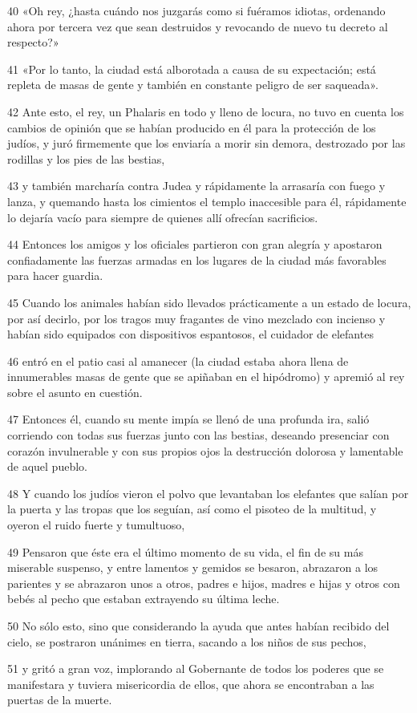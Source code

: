 \par 40 «Oh rey, ¿hasta cuándo nos juzgarás como si fuéramos idiotas, ordenando ahora por tercera vez que sean destruidos y revocando de nuevo tu decreto al respecto?»
\par 41 «Por lo tanto, la ciudad está alborotada a causa de su expectación; está repleta de masas de gente y también en constante peligro de ser saqueada».
\par 42 Ante esto, el rey, un Phalaris en todo y lleno de locura, no tuvo en cuenta los cambios de opinión que se habían producido en él para la protección de los judíos, y juró firmemente que los enviaría a morir sin demora, destrozado por las rodillas y los pies de las bestias,
\par 43 y también marcharía contra Judea y rápidamente la arrasaría con fuego y lanza, y quemando hasta los cimientos el templo inaccesible para él, rápidamente lo dejaría vacío para siempre de quienes allí ofrecían sacrificios.
\par 44 Entonces los amigos y los oficiales partieron con gran alegría y apostaron confiadamente las fuerzas armadas en los lugares de la ciudad más favorables para hacer guardia.
\par 45 Cuando los animales habían sido llevados prácticamente a un estado de locura, por así decirlo, por los tragos muy fragantes de vino mezclado con incienso y habían sido equipados con dispositivos espantosos, el cuidador de elefantes
\par 46 entró en el patio casi al amanecer (la ciudad estaba ahora llena de innumerables masas de gente que se apiñaban en el hipódromo) y apremió al rey sobre el asunto en cuestión.
\par 47 Entonces él, cuando su mente impía se llenó de una profunda ira, salió corriendo con todas sus fuerzas junto con las bestias, deseando presenciar con corazón invulnerable y con sus propios ojos la destrucción dolorosa y lamentable de aquel pueblo.
\par 48 Y cuando los judíos vieron el polvo que levantaban los elefantes que salían por la puerta y las tropas que los seguían, así como el pisoteo de la multitud, y oyeron el ruido fuerte y tumultuoso,
\par 49 Pensaron que éste era el último momento de su vida, el fin de su más miserable suspenso, y entre lamentos y gemidos se besaron, abrazaron a los parientes y se abrazaron unos a otros, padres e hijos, madres e hijas y otros con bebés al pecho que estaban extrayendo su última leche.
\par 50 No sólo esto, sino que considerando la ayuda que antes habían recibido del cielo, se postraron unánimes en tierra, sacando a los niños de sus pechos,
\par 51 y gritó a gran voz, implorando al Gobernante de todos los poderes que se manifestara y tuviera misericordia de ellos, que ahora se encontraban a las puertas de la muerte.

